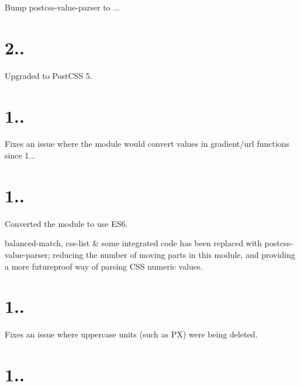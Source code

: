 \begin{DoxyItemize}
\item Bump postcss-\/value-\/parser to {..}.
\end{DoxyItemize}

\section*{2..}


\begin{DoxyItemize}
\item Upgraded to Post\+C\+SS 5.
\end{DoxyItemize}

\section*{1..}


\begin{DoxyItemize}
\item Fixes an issue where the module would convert values in gradient/url functions since 1...
\end{DoxyItemize}

\section*{1..}


\begin{DoxyItemize}
\item Converted the module to use E\+S6.
\item balanced-\/match, css-\/list \& some integrated code has been replaced with postcss-\/value-\/parser; reducing the number of moving parts in this module, and providing a more futureproof way of parsing C\+SS numeric values.
\end{DoxyItemize}

\section*{1..}


\begin{DoxyItemize}
\item Fixes an issue where uppercase units (such as PX) were being deleted.
\end{DoxyItemize}

\section*{1..}


